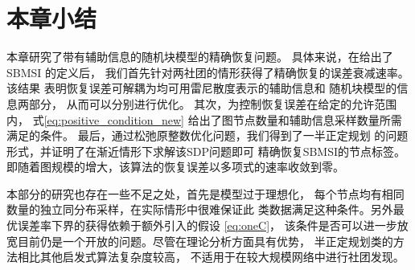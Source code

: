 

\section{本章小结}\label{sec:summary_sbmsi}
本章研究了带有辅助信息的随机块模型的精确恢复问题。
具体来说，在给出了 SBMSI 的定义后， 
我们首先针对两社团的情形获得了精确恢复的误差衰减速率。
该结果
表明恢复误差可解耦为均可用雷尼散度表示的辅助信息和
随机块模型的信息两部分，
从而可以分别进行优化。
其次，为控制恢复误差在给定的允许范围内，
式\eqref{eq:positive_condition_new}
给出了图节点数量和辅助信息采样数量所需满足的条件。
最后，通过松弛原整数优化问题，我们得到了一半正定规划
的问题形式，并证明了在渐近情形下求解该SDP问题即可
精确恢复SBMSI的节点标签。即随着图规模的增大，该算法的恢复误差以多项式的速率收敛到零。

本部分的研究也存在一些不足之处，首先是模型过于理想化，
每个节点均有相同数量的独立同分布采样，在实际情形中很难保证此
类数据满足这种条件。另外最优误差率下界的获得依赖于额外引入的假设 \eqref{eq:oneC}，
该条件是否可以进一步放宽目前仍是一个开放的问题。尽管在理论分析方面具有优势，
半正定规划类的方法相比其他启发式算法复杂度较高，
不适用于在较大规模网络中进行社团发现。

